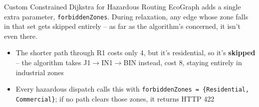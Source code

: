 \documentclass[aspectratio=169,11pt]{beamer}
\begin{document}
\begin{frame}[fragile]{Custom Constrained Dijkstra for Hazardous Routing}
\footnotesize
EcoGraph adds a single extra parameter, \texttt{forbiddenZones}. During relaxation, any edge whose zone falls in that set gets skipped entirely -- as far as the algorithm's concerned, it isn't even there.
\vspace{1mm}
\begin{center}
\end{center}
\vspace{1mm}
\begin{itemize}\itemsep1pt
\item The shorter path through R1 costs only 4, but it's residential, so it's \textbf{skipped} -- the algorithm takes J1$\to$IN1$\to$BIN instead, cost 8, staying entirely in industrial zones
\item Every hazardous dispatch calls this with \texttt{forbiddenZones = \{Residential, Commercial\}}; if no path clears those zones, it returns HTTP 422
\end{itemize}
\end{frame}
\end{document}
